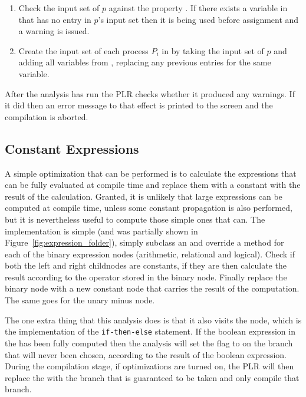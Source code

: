   	\begin{enumerate}
  		\item Check the input set of $p$ against the property 
  		. If there exists a variable in 
  		 that has no entry in $p$'s input set then it is 
  		being used before assignment and a warning is issued.
  		
  		\item Create the input set of each process $P_i$ in  
  		by taking the input set of $p$ and adding all variables from 
  		, replacing any previous entries for the 
  		same variable.
  	
  	\end{enumerate}
  	
  After the analysis has run the PLR checks whether it produced any warnings. 
  If it did then an error message to that effect is printed to the screen and 
  the compilation is aborted.
	

\subsection{Constant Expressions}

	A simple optimization that can be performed is to calculate the expressions 
	that can be fully evaluated at compile time and replace them with a constant 
	with the result of the calculation. Granted, it is unlikely that large 
	expressions can be computed at compile time, unless some constant 
	propagation is also performed, but it is nevertheless useful to compute 
	those simple ones that can. The implementation is simple (and was partially 
	shown in Figure~\ref{fig:expression_folder}), simply subclass an 
	 and override a  method for each of 
	the binary expression nodes (arithmetic, relational and logical). Check if 
	both the left and right childnodes are constants, if they are then 
	calculate the result according to the operator stored in the binary node. 
	Finally replace the binary node with a new constant node that carries the 
	result of the computation. The same goes for the unary minus node.
	
	The one extra thing that this analysis does is that it also visits the
	 node, which is the implementation of the
	\texttt{if-then-else} statement. If the boolean expression in the 
	 has been fully computed then the analysis will set 
	the  flag to  on the branch that will never 
	been chosen, according to the result of the boolean expression. During the 
	compilation stage, if optimizations are turned on, the PLR will then replace 
	the  with the branch that is guaranteed to be taken 
	and only compile that branch.

